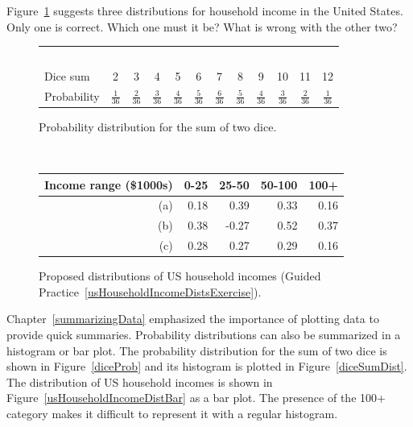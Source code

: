\begin{exercisewrap}
\begin{nexercise}\label{usHouseholdIncomeDistsExercise}
Figure~\ref{usHouseholdIncomeDists} suggests three distributions for household income in the United States. Only one is correct. Which one must it be? What is wrong with the other two?\footnotemark
\end{nexercise}
\end{exercisewrap}

\begin{figure}[hhh]
\centering
\begin{tabular}{l ccc ccc ccc cc}
  \hline
  \ \vspace{-3mm} \\
Dice sum\vspace{0.3mm} & 2 & 3 & 4 & 5 & 6 & 7 & 8 & 9 & 10 & 11 & 12  \\
Probability & $\frac{1}{36}$ & $\frac{2}{36}$ & $\frac{3}{36}$ & $\frac{4}{36}$ & $\frac{5}{36}$ & $\frac{6}{36}$ & $\frac{5}{36}$ & $\frac{4}{36}$ & $\frac{3}{36}$ & $\frac{2}{36}$ & $\frac{1}{36}$\vspace{1mm} \\
   \hline
\end{tabular}
\caption{Probability distribution for the sum of two dice.}
\label{diceProb}
\ \\[5mm]
\begin{tabular}{r | rr rr}
  \hline
Income range (\$1000s) & 0-25    & 25-50    & 50-100     & 100+    \\
  \hline
(a)\hspace{0.2mm}	 & 0.18 & 0.39 & 0.33 & 0.16 \\
(b)				 & 0.38 & -0.27 & 0.52 & 0.37 \\
(c)\hspace{0.2mm}	 & 0.28 & 0.27 & 0.29 & 0.16 \\
  \hline
\end{tabular}
\caption{Proposed distributions of US household incomes (Guided Practice~\ref{usHouseholdIncomeDistsExercise}).}
\label{usHouseholdIncomeDists}
\end{figure}


Chapter~\ref{summarizingData} emphasized the importance of plotting data to provide quick summaries. Probability distributions can also be summarized in a histogram or bar plot. The probability distribution for the sum of two dice is shown in Figure~\ref{diceProb} and its histogram is plotted in Figure~\ref{diceSumDist}. The distribution of US household incomes is shown in Figure~\ref{usHouseholdIncomeDistBar} as a bar plot. The presence of the 100+ category makes it difficult to represent it with a regular histogram.

